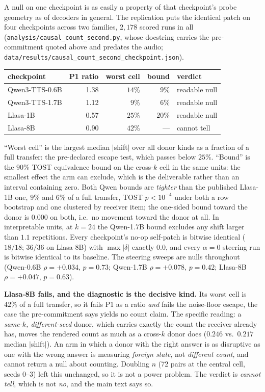 \documentclass[11pt]{article}
\begin{document}
A null on one checkpoint is as easily a property of that checkpoint's probe
geometry as of decoders in general. The replication puts the identical patch on
four checkpoints across two families, $2{,}178$ scored runs in all
(\texttt{analysis/causal\_count\_second.py}, whose docstring carries the
pre-commitment quoted above and predates the audio;
\texttt{data/results/causal\_count\_second\_checkpoint.json}).

\begin{center}
\begin{tabular}{@{}lrrrl@{}}
\toprule
checkpoint & P1 ratio & worst cell & bound & verdict \\
\midrule
Qwen3-TTS-0.6B & 1.38 & $14\%$ & $9\%$  & readable null \\
Qwen3-TTS-1.7B & 1.12 & $9\%$  & $6\%$  & readable null \\
Llasa-1B       & 0.57 & $25\%$ & $20\%$ & readable null \\
Llasa-8B       & 0.90 & $42\%$ & ---    & cannot tell \\
\bottomrule
\end{tabular}
\end{center}

\noindent ``Worst cell'' is the largest median $|$shift$|$ over all donor kinds
as a fraction of a full transfer: the pre-declared escape test, which passes
below $25\%$. ``Bound'' is the $90\%$ TOST equivalence bound on the cross-$k$
cell in the same units: the smallest effect the arm can exclude, which is the
deliverable rather than an interval containing zero. Both Qwen bounds are
\emph{tighter} than the published Llasa-1B one, $9\%$ and $6\%$ of a full
transfer, TOST $p<10^{-4}$ under both a row bootstrap and one clustered by
receiver item; the one-sided bound toward the donor is $0.000$ on both, i.e.\
no movement toward the donor at all. In interpretable units, at $k{=}24$ the
Qwen-1.7B bound excludes any shift larger than $1.1$ repetitions. Every
checkpoint's no-op self-patch is bitwise identical ($18/18$; $36/36$ on
Llasa-8B) with $\max|\delta|$ exactly $0.0$, and every $\alpha{=}0$ steering run
is bitwise identical to its baseline. The steering sweeps are nulls throughout
(Qwen-0.6B $\rho{=}{+}0.034$, $p{=}0.73$; Qwen-1.7B $\rho{=}{+}0.078$,
$p{=}0.42$; Llasa-8B $\rho{=}{+}0.047$, $p{=}0.63$).

\textbf{Llasa-8B fails, and the diagnostic is the decisive kind.} Its worst
cell is $42\%$ of a full transfer, so it fails P1 as a ratio \emph{and} fails
the noise-floor escape, the case the pre-commitment says yields no count
claim. The specific reading: a \emph{same-$k$, different-seed} donor, which
carries exactly the count the receiver already has, moves the rendered count as
much as a cross-$k$ donor does ($0.246$ vs.\ $0.217$ median $|$shift$|$). An arm
in which a donor with the right answer is as disruptive as one with the wrong
answer is measuring \emph{foreign state}, not \emph{different count}, and cannot
return a null about counting. Doubling $n$ (72 pairs at the central cell, seeds
0--3) left this unchanged, so it is not a power problem. The verdict is
\emph{cannot tell}, which is not \emph{no}, and the main text says so.
\end{document}
